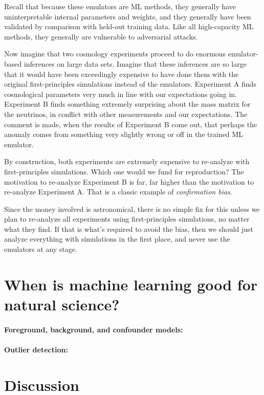 \documentclass[11pt]{article}
\begin{document}
Recall that because these emulators are ML methods, they generally have uninterpretable internal parameters and weights, and they generally have been validated by comparison with held-out training data.
Like all high-capacity ML methods, they generally are vulnerable to adversarial attacks.

Now imagine that two cosmology experiments proceed to do enormous emulator-based inferences on large data sets.
Imagine that these inferences are so large that it would have been exceedingly expensive to have done them with the original first-principles simulations instead of the emulators.
Experiment A finds cosmological parameters very much in line with our expectations going in.
Experiment B finds something extremely surprising about the mass matrix for the neutrinos, in conflict with other measurements and our expectations.
The comment is made, when the results of Experiment B come out, that perhaps the anomaly comes from something very slightly wrong or off in the trained ML emulator.

By construction, both experiments are extremely expensive to re-analyze with first-principles simulations.
Which one would we fund for reproduction?
The motivation to re-analyze Experiment B is far, far higher than the motivation to re-analyze Experiment A.
That is a classic example of \emph{confirmation bias}.

Since the money involved is astronomical, there is no simple fix for this unless we plan to re-analyze all experiments using first-principles simulations, no matter what they find.
If that is what's required to avoid the bias, then we should just analyze everything with simulations in the first place, and never use the emulators at any stage.

\section{When is machine learning good for natural science?}\label{sec:good}

\paragraph{Foreground, background, and confounder models:}

\paragraph{Outlier detection:}

\section{Discussion}\label{sec:discussion}
\end{document}
